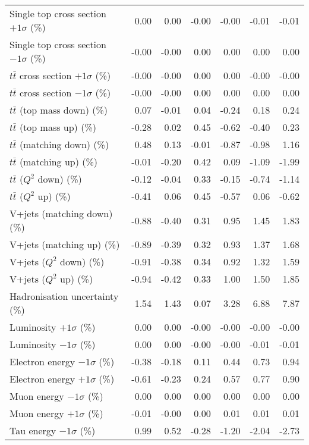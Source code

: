 \begin{table}[htbp]
{\begin{tabular}{lrrrrrr}
Single top cross section $+1\sigma$ (\%) & 0.00 & 0.00 & -0.00 & -0.00 & -0.01 & -0.01 \\ 
Single top cross section $-1\sigma$ (\%) & -0.00 & -0.00 & 0.00 & 0.00 & 0.00 & 0.00 \\ 
$t\bar{t}$ cross section $+1\sigma$ (\%) & -0.00 & -0.00 & 0.00 & 0.00 & -0.00 & -0.00 \\ 
$t\bar{t}$ cross section $-1\sigma$ (\%) & -0.00 & -0.00 & 0.00 & 0.00 & 0.00 & 0.00 \\ 
$t\bar{t}$ (top mass down) (\%) & 0.07 & -0.01 & 0.04 & -0.24 & 0.18 & 0.24 \\ 
$t\bar{t}$ (top mass up) (\%) & -0.28 & 0.02 & 0.45 & -0.62 & -0.40 & 0.23 \\ 
$t\bar{t}$ (matching down) (\%) & 0.48 & 0.13 & -0.01 & -0.87 & -0.98 & 1.16 \\ 
$t\bar{t}$ (matching up) (\%) & -0.01 & -0.20 & 0.42 & 0.09 & -1.09 & -1.99 \\ 
$t\bar{t}$ ($Q^{2}$ down) (\%) & -0.12 & -0.04 & 0.33 & -0.15 & -0.74 & -1.14 \\ 
$t\bar{t}$ ($Q^{2}$ up) (\%) & -0.41 & 0.06 & 0.45 & -0.57 & 0.06 & -0.62 \\ 
V+jets (matching down) (\%) & -0.88 & -0.40 & 0.31 & 0.95 & 1.45 & 1.83 \\ 
V+jets (matching up) (\%) & -0.89 & -0.39 & 0.32 & 0.93 & 1.37 & 1.68 \\ 
V+jets ($Q^{2}$ down) (\%) & -0.91 & -0.38 & 0.34 & 0.92 & 1.32 & 1.59 \\ 
V+jets ($Q^{2}$ up) (\%) & -0.94 & -0.42 & 0.33 & 1.00 & 1.50 & 1.85 \\ 
Hadronisation uncertainty (\%) & 1.54 & 1.43 & 0.07 & 3.28 & 6.88 & 7.87 \\ 
Luminosity $+1\sigma$ (\%) & 0.00 & 0.00 & -0.00 & -0.00 & -0.00 & -0.00 \\ 
Luminosity $-1\sigma$ (\%) & 0.00 & 0.00 & -0.00 & -0.00 & -0.01 & -0.01 \\ 
Electron energy $-1\sigma$ (\%) & -0.38 & -0.18 & 0.11 & 0.44 & 0.73 & 0.94 \\ 
Electron energy $+1\sigma$ (\%) & -0.61 & -0.23 & 0.24 & 0.57 & 0.77 & 0.90 \\ 
Muon energy $-1\sigma$ (\%) & 0.00 & 0.00 & 0.00 & 0.00 & 0.00 & 0.00 \\ 
Muon energy $+1\sigma$ (\%) & -0.01 & -0.00 & 0.00 & 0.01 & 0.01 & 0.01 \\ 
Tau energy $-1\sigma$ (\%) & 0.99 & 0.52 & -0.28 & -1.20 & -2.04 & -2.73 \\ 

\end{tabular}}
\end{table}
